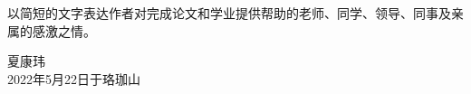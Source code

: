 
\acknowledgements


以简短的文字表达作者对完成论文和学业提供帮助的老师、同学、领导、同事及亲属的感激之情。


\begin{signature}
  夏康玮 \\
  2022年5月22日于珞珈山
\end{signature}